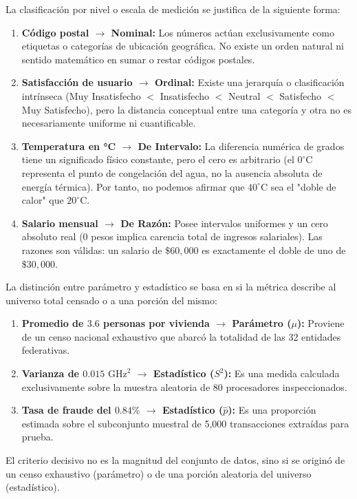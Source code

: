 \begin{solproblema}
	La clasificación por nivel o escala de medición se justifica de la siguiente forma:
	\begin{enumerate}
		\item \textbf{Código postal $\to$ Nominal:} Los números actúan exclusivamente como etiquetas o categorías de ubicación geográfica. No existe un orden natural ni sentido matemático en sumar o restar códigos postales.
		\item \textbf{Satisfacción de usuario $\to$ Ordinal:} Existe una jerarquía o clasificación intrínseca (Muy Insatisfecho $<$ Insatisfecho $<$ Neutral $<$ Satisfecho $<$ Muy Satisfecho), pero la distancia conceptual entre una categoría y otra no es necesariamente uniforme ni cuantificable.
		\item \textbf{Temperatura en °C $\to$ De Intervalo:} La diferencia numérica de grados tiene un significado físico constante, pero el cero es arbitrario (el $0^\circ\text{C}$ representa el punto de congelación del agua, no la ausencia absoluta de energía térmica). Por tanto, no podemos afirmar que $40^\circ\text{C}$ sea el "doble de calor" que $20^\circ\text{C}$.
		\item \textbf{Salario mensual $\to$ De Razón:} Posee intervalos uniformes y un cero absoluto real ($0$ pesos implica carencia total de ingresos salariales). Las razones son válidas: un salario de $\$60,000$ es exactamente el doble de uno de $\$30,000$.
	\end{enumerate}
\end{solproblema}

\begin{solproblema}[prob:7b7dc88]
	La distinción entre parámetro y estadístico se basa en si la métrica describe al universo total censado o a una porción del mismo:
	\begin{enumerate}
		\item \textbf{Promedio de $3.6$ personas por vivienda $\to$ Parámetro ($\mu$):} Proviene de un censo nacional exhaustivo que abarcó la totalidad de las 32 entidades federativas.
		\item \textbf{Varianza de $0.015 \text{ GHz}^2$ $\to$ Estadístico ($S^2$):} Es una medida calculada exclusivamente sobre la muestra aleatoria de 80 procesadores inspeccionados.
		\item \textbf{Tasa de fraude del $0.84\%$ $\to$ Estadístico ($\hat{p}$):} Es una proporción estimada sobre el subconjunto muestral de 5,000 transacciones extraídas para prueba.
	\end{enumerate}
	El criterio decisivo no es la magnitud del conjunto de datos, sino si se originó de un censo exhaustivo (parámetro) o de una porción aleatoria del universo (estadístico).
\end{solproblema}

